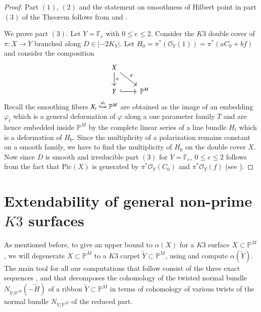 \documentclass[11pt,twoside]{amsart}
\theoremstyle{plain}
\numberwithin{equation}{section}
\theoremstyle{definition}
\begin{document}
\begin{proof} Part $(1)$, $(2)$ and the statement on smoothness of Hilbert point in part $(3)$ of the Theorem follows from \cite[Theorem $3.1 (3)$, Theorem $4.3$, Theorem $5.1$]{BMR21} and \cite[Proposition $1.7$, Theorem $3.5$, Theorem $4.1$]{GP97}.
    

We prove part $(3)$. Let $Y = \mathbb{F}_e$ with $0 \leq e \leq 2$. Consider the $K3$ double cover of $\pi:X \to Y$ branched along $D \in |-2K_Y|$. Let $H_0 = \pi^*(\mathcal{O}_{Y}(1)) = \pi^*(aC_0+bf)$ and consider the composition  
\[
\begin{tikzcd}
X \arrow[dr, "\varphi"] \arrow[d, "\pi"] & \\
Y \arrow[r, hook] & \mathbb{P}^M
\end{tikzcd}
\]
Recall the smoothing fibers $X_t \xhookrightarrow{\varphi_t} \mathbb{P}^M$ are obtained as the image of an embedding $\varphi_t$ which is a general deformation of $\varphi$ along a one parameter family $T$ and are hence embedded inside $\mathbb{P}^M$ by the complete linear series of a line bundle $H_t$ which is a deformation of $H_0$. Since the multiplicity of a polarization remains constant on a smooth family, we have to find the multiplicity of $H_0$ on the double cover $X$. Now since $D$ is smooth and irreducible part $(3)$ for $Y = \mathbb{F}_e$, $0 \leq e \leq 2$ follows from the fact that $\textrm{Pic}(X)$ is generated by $\pi^*\mathcal{O}_Y(C_0)$ and $\pi^*\mathcal{O}_Y(f)$ (see \cite[Proposition $6.3$]{AHL10}).

\end{proof}

\section{Extendability of general non-prime $K3$ surfaces}





As mentioned before, to give an upper bound to $\alpha(X)$ for a $K3$ surface $X \subset \mathbb{P}^M$, we will degenerate $X \subset \mathbb{P}^M$ to a $K3$ carpet $\widetilde{Y} \subset \mathbb{P}^M$, using  and compute $\alpha(\widetilde{Y})$.  The main tool for all our computations that follow consist of the three exact sequences ,  and   that decomposes the cohomology of the twisted normal bundle $N_{\widetilde{Y}/\mathbb{P}^M}(-\widetilde{H})$ of a ribbon $\widetilde{Y} \subset \mathbb{P}^M$ in terms of cohomology of various twists of the normal bundle $N_{Y/\mathbb{P}^M}$ of the reduced part. 
\end{document}

